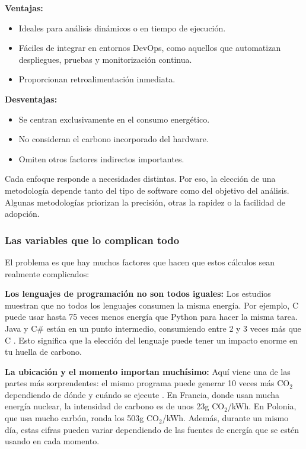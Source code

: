 \documentclass[12pt,a4paper]{report}
\begin{document}
\begin{itemize}
        \textbf{Ventajas:}
        \begin{itemize}
          \item Ideales para análisis dinámicos o en tiempo de ejecución.
          \item Fáciles de integrar en entornos DevOps, como aquellos que automatizan despliegues, pruebas y monitorización continua.
          \item Proporcionan retroalimentación inmediata.
        \end{itemize}
        \textbf{Desventajas:}
        \begin{itemize}
          \item Se centran exclusivamente en el consumo energético.
          \item No consideran el carbono incorporado del hardware.
          \item Omiten otros factores indirectos importantes.
        \end{itemize}
\end{itemize}

Cada enfoque responde a necesidades distintas. Por eso, la elección de una metodología depende tanto del tipo de software como del objetivo del análisis. Algunas metodologías priorizan la precisión, otras la rapidez o la facilidad de adopción.

\subsubsection{Las variables que lo complican todo}

El problema es que hay muchos factores que hacen que estos cálculos sean realmente complicados:

\textbf{Los lenguajes de programación no son todos iguales:} Los estudios muestran que no todos los lenguajes consumen la misma energía. Por ejemplo, C puede usar hasta 75 veces menos energía que Python para hacer la misma tarea. Java y C\# están en un punto intermedio, consumiendo entre 2 y 3 veces más que C \cite{ref7}. Esto significa que la elección del lenguaje puede tener un impacto enorme en tu huella de carbono.

\textbf{La ubicación y el momento importan muchísimo:} Aquí viene una de las partes más sorprendentes: el mismo programa puede generar 10 veces más CO$_2$ dependiendo de dónde y cuándo se ejecute \cite{ref8}. En Francia, donde usan mucha energía nuclear, la intensidad de carbono es de unos 23g CO$_2$/kWh. En Polonia, que usa mucho carbón, ronda los 503g CO$_2$/kWh. Además, durante un mismo día, estas cifras pueden variar dependiendo de las fuentes de energía que se estén usando en cada momento.
\end{document}
